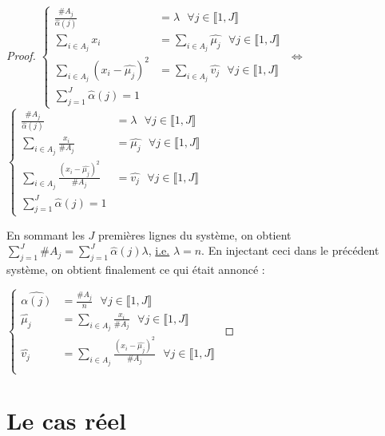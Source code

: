 \documentclass[frenchb]{report}
\newcommand{\1}{\mathbbm{1}}
\theoremstyle{definition}\newtheorem{defn}{Définition}
\theoremstyle{definition}\newtheorem{exm}{Exemple}
\theoremstyle{definition}\newtheorem{nota}{Notation}
\theoremstyle{definition}\newtheorem{rem}{Remarque}
\begin{document}
\begin{proof}
$
\begin{cases}
\displaystyle\frac{\#A_j}{\hat{\alpha}(j)} &= \lambda \text{ } \forall j \in \llbracket 1,J \rrbracket \\
\displaystyle\sum_{i\in A_j}x_i & =\displaystyle\sum_{i\in A_j} \hat{\mu_j} \text{ } \forall j \in \llbracket 1,J \rrbracket \\
\displaystyle\sum_{i\in A_j} (x_i-\hat{\mu_j})^2 &= \displaystyle\sum_{i\in A_j} \hat{v_j}  \text{ } \forall j \in \llbracket 1,J \rrbracket \\
\displaystyle\sum_{j=1}^J \hat{\alpha}(j) = 1
\end{cases}
$
$\Leftrightarrow$
$
\begin{cases}
\displaystyle\frac{\#A_j}{\hat{\alpha}(j)} &= \lambda \text{ } \forall j \in \llbracket 1,J \rrbracket \\
\displaystyle\sum_{i\in A_j}\frac{x_i}{\#A_j} & = \hat{\mu_j} \text{ } \forall j \in \llbracket 1,J \rrbracket \\
\displaystyle\sum_{i\in A_j} \frac{(x_i-\hat{\mu_j})^2}{\#A_j} &=  \hat{v_j}  \text{ } \forall j \in \llbracket 1,J \rrbracket \\
\displaystyle\sum_{j=1}^J \hat{\alpha}(j) = 1
\end{cases}
$

En sommant les $J$ premières lignes du système, on obtient $\displaystyle\sum_{j=1}^J\#A_j = \sum_{j=1}^J\hat{\alpha}(j)\lambda$, \underline{i.e.} $\lambda = n$. En injectant ceci dans le précédent système, on obtient finalement ce qui était annoncé :

$
\begin{cases}
\hat{\alpha(j)} &= \displaystyle \frac{\#A_j}{n} \text{ } \forall j \in \llbracket 1,J \rrbracket \\
\hat{\mu_j} &= \displaystyle\sum_{i\in A_j}\frac{x_i}{\#A_j} \text{ } \forall j \in \llbracket 1,J \rrbracket \\
\hat{v_j} &= \displaystyle\sum_{i\in A_j} \frac{(x_i-\hat{\mu_j})^2}{\#A_j}  \text{ } \forall j \in \llbracket 1,J \rrbracket \\
\end{cases}
$


\end{proof}


\section{Le cas réel}

\pagebreak
\end{document}
